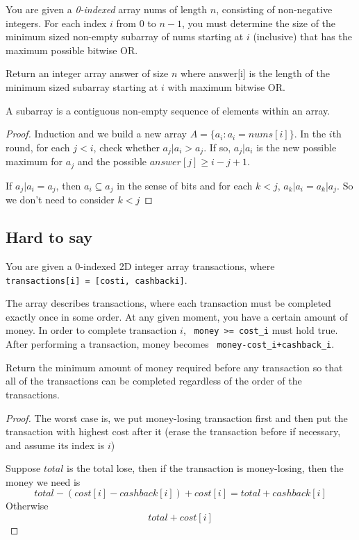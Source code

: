 \documentclass[11pt]{article}
\let\OldTexttt\texttt
\renewcommand{\texttt}[1]{\OldTexttt{\color{MidnightBlue} #1}}
\begin{document}
\begin{problem}
You are given a \emph{0-indexed} array nums of length \(n\), consisting of non-negative integers. For
each index \(i\) from 0 to \(n-1\), you must determine the size of the minimum sized non-empty
subarray of nums starting at \(i\) (inclusive) that has the maximum possible bitwise OR.

Return an integer array answer of size \(n\) where answer[i] is the length of the minimum sized subarray
starting at \(i\) with maximum bitwise OR.

A subarray is a contiguous non-empty sequence of elements within an array.
\end{problem}

\begin{proof}
Induction and we build a new array \(A=\{a_i:a_i=nums[i]\}\). In the \(i\)th round, for
each \(j<i\), check whether \(a_j|a_i>a_j\). If so, \(a_j|a_i\) is the new possible maximum
for \(a_j\) and the possible \(answer[j]\ge i-j+1\).

If \(a_j|a_i=a_j\), then \(a_i\subseteq a_j\) in the sense of bits and for
each \(k<j\), \(a_k|a_i=a_k|a_j\). So we don't need to consider \(k<j\)
\end{proof}
\subsection{Hard to say}
\label{sec:org41234af}
\begin{problem}
You are given a 0-indexed 2D integer array transactions, where \texttt{transactions[i] = [costi, cashbacki]}.

The array describes transactions, where each transaction must be completed exactly once in some
order. At any given moment, you have a certain amount of money. In order to complete transaction
\(i\), \texttt{money >= cost\_i} must hold true. After performing a transaction, money becomes \texttt{money-cost\_i+cashback\_i}.

Return the minimum amount of money required before any transaction so that all of the
transactions can be completed regardless of the order of the transactions.
\end{problem}

\begin{proof}
The worst case is, we put money-losing transaction first and then put the transaction with
highest cost after it (erase the transaction before if necessary, and assume its index is \(i\))

Suppose \(total\) is the total lose, then if the transaction is money-losing, then the money we need is
\begin{equation*}
total-(cost[i]-cashback[i])+cost[i] = total+cashback[i]
\end{equation*}
Otherwise
\begin{equation*}
total+cost[i]
\end{equation*}
\end{proof}
\end{document}
